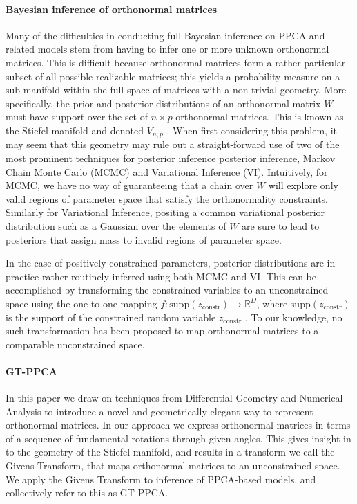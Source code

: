 \documentclass{article}
\begin{document}
\paragraph{Bayesian inference of orthonormal matrices} Many of the difficulties in conducting full Bayesian inference on PPCA and related models stem from having to infer one or more unknown orthonormal matrices.  This is difficult because orthonormal matrices form a rather particular subset of all possible realizable matrices; this yields a probability measure on a sub-manifold within the full space of matrices with a non-trivial geometry.  More specifically, the prior and posterior distributions of an orthonormal matrix $W$ must have support over the set of $n \times p$ orthonormal matrices.  This is known as the Stiefel manifold and denoted $V_{n,p}$ \citep{muirhead2009aspects}.  When first considering this problem, it may seem that this geometry may rule out a straight-forward use of two of the most prominent techniques for posterior inference posterior inference, Markov Chain Monte Carlo (MCMC) and Variational Inference (VI).  Intuitively, for MCMC, we have no way of guaranteeing that a chain over $W$ will explore only valid regions of parameter space that satisfy the orthonormality constraints. Similarly for Variational Inference, positing a common variational posterior distribution such as a Gaussian over the elements of $W$ are sure to lead to posteriors that assign mass to invalid regions of parameter space.

In the case of positively constrained parameters, posterior distributions are in practice rather routinely inferred using both MCMC and VI. This can be accomplished by transforming the constrained variables to an unconstrained space using the one-to-one mapping $f: \mathrm{supp}(z_\mathrm{constr}) \to \mathbb{R}^D$, where $\mathrm{supp}(z_\mathrm{constr})$ is the support of the constrained random variable $z_\mathrm{constr}$ \citep{carpenter2016stan, kucukelbir2014fully}. To our knowledge, no such transformation has been proposed to map orthonormal matrices to a comparable unconstrained space.

\paragraph{GT-PPCA} In this paper we draw on techniques from Differential Geometry and Numerical Analysis to introduce a novel and geometrically elegant way to represent orthonormal matrices.  In our approach  we express orthonormal matrices in terms of a sequence of fundamental rotations through given angles. This gives insight in to the geometry of the Stiefel manifold, and results in a transform we call the Givens Transform, that maps orthonormal matrices to an unconstrained space. We apply the Givens Transform to inference of PPCA-based models, and collectively refer to this as GT-PPCA.
\end{document}
